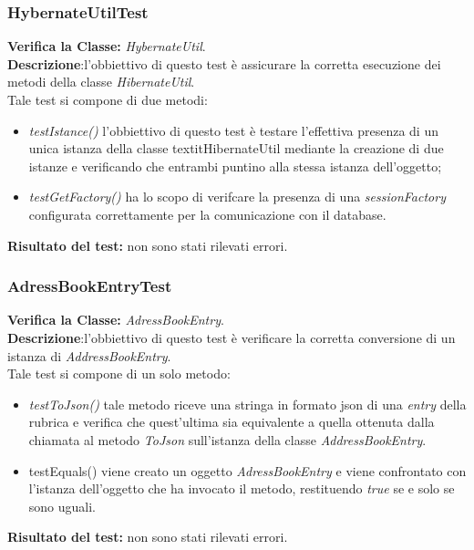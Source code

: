 \subsubsection{HybernateUtilTest}
\textbf{Verifica la Classe:} \textit{HybernateUtil}.\\
\textbf{Descrizione}:l'obbiettivo di questo test è assicurare la corretta esecuzione dei metodi della classe \textit{HibernateUtil}. \\
Tale test si compone di due metodi:
\begin{itemize}
\item \textit{testIstance() } l'obbiettivo di questo test è testare l'effettiva presenza di un unica istanza della classe textit{HibernateUtil} mediante la creazione di due istanze e verificando che entrambi puntino alla stessa istanza dell'oggetto;
\item \textit{testGetFactory()} ha lo scopo di verifcare la presenza di una \textit{sessionFactory} configurata correttamente per la comunicazione con il database.
\end{itemize}
\textbf{Risultato del test:} non sono stati rilevati errori.


\subsubsection{AdressBookEntryTest}
\textbf{Verifica la Classe:} \textit{AdressBookEntry}.\\
\textbf{Descrizione}:l'obbiettivo di questo test è verificare la corretta conversione di un istanza di \textit{AddressBookEntry}.\\
Tale test si compone di un solo metodo:
\begin{itemize}
\item \textit{testToJson() } tale metodo riceve una stringa in formato json di una 	\textit{entry} della rubrica e verifica che quest'ultima sia equivalente a quella ottenuta dalla chiamata al metodo \textit{ToJson} sull'istanza della classe \textit{AddressBookEntry}.
\item{testEquals()} viene creato un oggetto \textit{AdressBookEntry} e viene confrontato con l'istanza dell'oggetto che ha invocato il metodo, restituendo \textit{true} se e solo se sono uguali.
\end{itemize}
\textbf{Risultato del test:} non sono stati rilevati errori.


